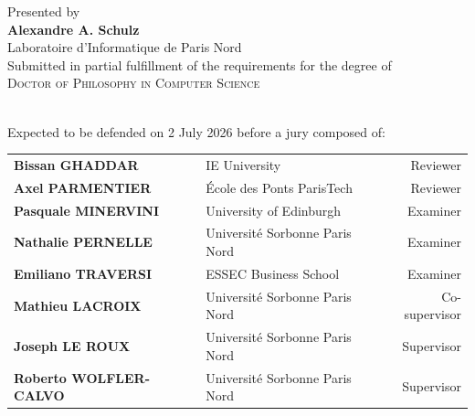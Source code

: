 \begin{titlepage}
\begin{center}
Presented by\\[0.2cm]

{\Large \textbf{Alexandre A. Schulz}}\\[0.2cm]

Laboratoire d'Informatique de Paris Nord
~\\[0.2cm]

Submitted in partial fulfillment of the requirements for the degree of\\[0.2cm]
{\Large \textsc{Doctor of Philosophy in Computer Science}}

\HRule \\[0.2cm]

Expected to be defended on 2 July 2026 before a jury composed of:\\[0.1cm]
\small
 \renewcommand{\arraystretch}{1.18}
    \begin{tabular}{@{}l l r@{}}
        \textbf{Bissan GHADDAR} & {\small IE University} & Reviewer \\
        \textbf{Axel PARMENTIER} & {\small École des Ponts ParisTech} & Reviewer \\
        \textbf{Pasquale MINERVINI} & {\small University of Edinburgh} & Examiner \\
        \textbf{Nathalie PERNELLE} & {\small Université Sorbonne Paris Nord} & Examiner \\
        \textbf{Emiliano TRAVERSI} & {\small ESSEC Business School} & Examiner \\
        \textbf{Mathieu LACROIX} & {\small Université Sorbonne Paris Nord} & Co-supervisor \\
        \textbf{Joseph LE ROUX}  & {\small Université Sorbonne Paris Nord} & Supervisor \\
        \textbf{Roberto WOLFLER-CALVO} & {\small Université Sorbonne Paris Nord} & Supervisor \\
    \end{tabular}
    \renewcommand{\arraystretch}{1}

\end{center}
\end{titlepage}